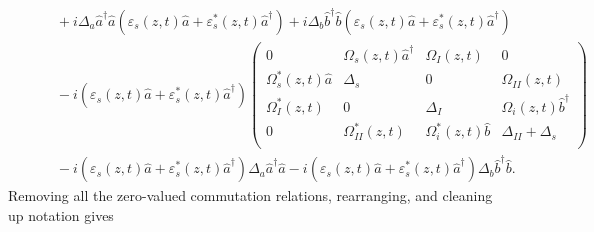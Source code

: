 \documentclass[aps,pra,showpacs,amsmath,amssymb,nofootinbib,longbibliography,superscriptaddress
]{revtex4-1}
\theoremstyle{definition}
\theoremstyle{remark}
\newcommand{\0}{\hat{0}}
\begin{document}
\begin{align}
    &\;\;\;\;\;\;\;\;+ i \Delta_a \hat{a}^{\dagger}\hat{a} (\varepsilon_s(z, t) \hat{a} + \varepsilon_s^*(z, t) \hat{a}^{\dagger}) +
    i \Delta_b  \hat{b}^{\dagger}\hat{b} (\varepsilon_s(z, t) \hat{a} + \varepsilon_s^*(z, t) \hat{a}^{\dagger}) \nonumber \\
    &\;\;\;\;\;\;\;\;- i (\varepsilon_s(z, t) \hat{a} + \varepsilon_s^*(z, t) \hat{a}^{\dagger}) \left(
        \begin{array}{cccc}
            0 & \Omega_{s}(z,t) \hat{a}^{\dagger} & \Omega_{I}(z,t) & 0\\
            \Omega_{s}^*(z,t) \hat{a} & \Delta_s & 0 & \Omega_{II}(z,t)\\
            \Omega_{I}^*(z,t) & 0 & \Delta_I & \Omega_{i}(z,t) \hat{b}^{\dagger}\\
            0 & \Omega_{II}^*(z,t) & \Omega_{i}^*(z,t) \hat{b} & \Delta_{II} + \Delta_s\\
        \end{array}
    \right) \nonumber \\
    &\;\;\;\;\;\;\;\; - i (\varepsilon_s(z, t) \hat{a} + \varepsilon_s^*(z, t) \hat{a}^{\dagger}) \Delta_a \hat{a}^{\dagger}\hat{a} -
    i (\varepsilon_s(z, t) \hat{a} + \varepsilon_s^*(z, t) \hat{a}^{\dagger}) \Delta_b  \hat{b}^{\dagger}\hat{b}.
\end{align}
Removing all the zero-valued commutation relations, rearranging, and cleaning up notation gives
\end{document}

